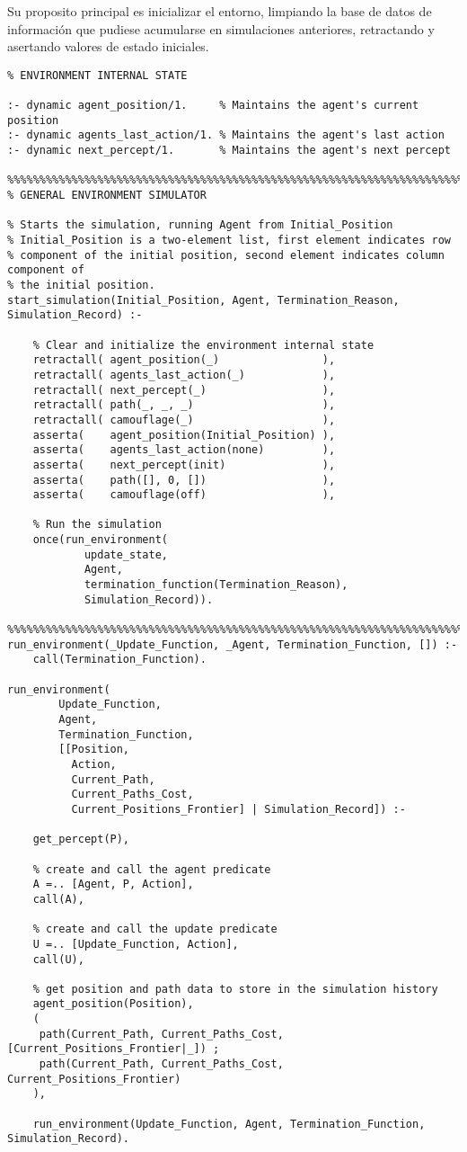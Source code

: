 \documentclass[a4paper,12pt]{report}
\begin{document}
Su proposito principal es inicializar el entorno, limpiando la base de datos de informaci\'{o}n que pudiese acumularse en
simulaciones anteriores, retractando y asertando valores de estado iniciales.

\begin{verbatim}
% ENVIRONMENT INTERNAL STATE

:- dynamic agent_position/1.     % Maintains the agent's current position
:- dynamic agents_last_action/1. % Maintains the agent's last action
:- dynamic next_percept/1.       % Maintains the agent's next percept

%%%%%%%%%%%%%%%%%%%%%%%%%%%%%%%%%%%%%%%%%%%%%%%%%%%%%%%%%%%%%%%%%%%%%%%%%%%%%%%%
% GENERAL ENVIRONMENT SIMULATOR

% Starts the simulation, running Agent from Initial_Position
% Initial_Position is a two-element list, first element indicates row
% component of the initial position, second element indicates column component of
% the initial position.
start_simulation(Initial_Position, Agent, Termination_Reason, Simulation_Record) :-

    % Clear and initialize the environment internal state
    retractall( agent_position(_)                ),
    retractall( agents_last_action(_)            ),
    retractall( next_percept(_)                  ),
    retractall( path(_, _, _)                    ),
    retractall( camouflage(_)                    ),
    asserta(    agent_position(Initial_Position) ),
    asserta(    agents_last_action(none)         ),
    asserta(    next_percept(init)               ),
    asserta(    path([], 0, [])                  ),
    asserta(    camouflage(off)                  ),

    % Run the simulation
    once(run_environment(
            update_state,
            Agent,
            termination_function(Termination_Reason),
            Simulation_Record)).

%%%%%%%%%%%%%%%%%%%%%%%%%%%%%%%%%%%%%%%%%%%%%%%%%%%%%%%%%%%%%%%%%%%%%%%%%%%%%%%%
run_environment(_Update_Function, _Agent, Termination_Function, []) :-
    call(Termination_Function).

run_environment(
        Update_Function,
        Agent,
        Termination_Function,
        [[Position,
          Action,
          Current_Path,
          Current_Paths_Cost,
          Current_Positions_Frontier] | Simulation_Record]) :-

    get_percept(P),

    % create and call the agent predicate
    A =.. [Agent, P, Action],
    call(A),

    % create and call the update predicate
    U =.. [Update_Function, Action],
    call(U),

    % get position and path data to store in the simulation history
    agent_position(Position),
    (
     path(Current_Path, Current_Paths_Cost, [Current_Positions_Frontier|_]) ;
     path(Current_Path, Current_Paths_Cost, Current_Positions_Frontier)
    ),

    run_environment(Update_Function, Agent, Termination_Function, Simulation_Record).

\end{verbatim}
\end{document}
